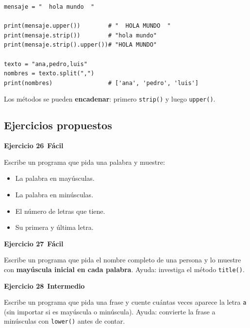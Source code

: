 \documentclass[11pt,a4paper]{article}
\newcommand{\facil}{\textcolor{verdeSignal}{\faIcon{circle}\,\textbf{Fácil}}}
\newcommand{\intermedio}{\textcolor{naranjaVivo}{\faIcon{circle}\,\textbf{Intermedio}}}
\begin{document}
\begin{cajaEjemplo}
\begin{lstlisting}[style=pythonStyle, caption={Usando métodos}]
mensaje = "  hola mundo  "

print(mensaje.upper())        # "  HOLA MUNDO  "
print(mensaje.strip())        # "hola mundo"
print(mensaje.strip().upper())# "HOLA MUNDO"

texto = "ana,pedro,luis"
nombres = texto.split(",")
print(nombres)                # ['ana', 'pedro', 'luis']
\end{lstlisting}

Los métodos se pueden \textbf{encadenar}: primero \texttt{strip()} y luego \texttt{upper()}.
\end{cajaEjemplo}

\subsection{Ejercicios propuestos}

\begin{cajaEjercicio}
\textbf{Ejercicio 26} \facil

Escribe un programa que pida una palabra y muestre:
\begin{itemize}
    \item La palabra en mayúsculas.
    \item La palabra en minúsculas.
    \item El número de letras que tiene.
    \item Su primera y última letra.
\end{itemize}
\end{cajaEjercicio}

\begin{cajaEjercicio}
\textbf{Ejercicio 27} \facil

Escribe un programa que pida el nombre completo de una persona y lo muestre con \textbf{mayúscula inicial en cada palabra}. Ayuda: investiga el método \texttt{title()}.
\end{cajaEjercicio}

\begin{cajaEjercicio}
\textbf{Ejercicio 28} \intermedio

Escribe un programa que pida una frase y cuente cuántas veces aparece la letra \texttt{a} (sin importar si es mayúscula o minúscula). Ayuda: convierte la frase a minúsculas con \texttt{lower()} antes de contar.
\end{cajaEjercicio}
\end{document}
